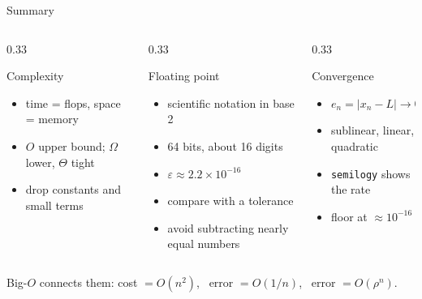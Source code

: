 \documentclass[aspectratio=169]{beamer}
\begin{document}
\begin{frame}{Summary}
\begin{columns}[T]
\begin{column}{0.33\textwidth}
\begin{block}{Complexity}
\scriptsize
\begin{itemize}
  \item time = flops, space = memory
  \item $O$ upper bound; $\Omega$ lower, $\Theta$ tight
  \item drop constants and small terms
\end{itemize}
\end{block}
\end{column}
\begin{column}{0.33\textwidth}
\begin{block}{Floating point}
\scriptsize
\begin{itemize}
  \item scientific notation in base 2
  \item 64 bits, about 16 digits
  \item $\varepsilon \approx 2.2\times10^{-16}$
  \item compare with a tolerance
  \item avoid subtracting nearly equal numbers
\end{itemize}
\end{block}
\end{column}
\begin{column}{0.33\textwidth}
\begin{block}{Convergence}
\scriptsize
\begin{itemize}
  \item $e_n = |x_n - L| \to 0$
  \item sublinear, linear, quadratic
  \item \texttt{semilogy} shows the rate
  \item floor at $\approx 10^{-16}$
\end{itemize}
\end{block}
\end{column}
\end{columns}
\vspace{0.4cm}
\centering
\small Big-$O$ connects them: cost $= O(n^2)$, \ error $= O(1/n)$, \ error $= O(\rho^n)$.
\end{frame}
\end{document}
